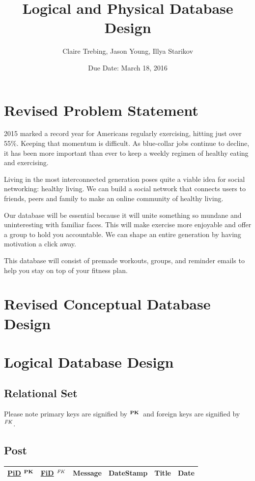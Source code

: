 \documentclass{article}
\title{Logical and Physical Database Design}
\author{Claire Trebing, Jason Young, Illya Starikov}
\date{Due Date: March 18, 2016}
\newcommand{\pk}{$^{\text{\textbf{PK}}}$}
\newcommand{\fk}{$^{\text{\textit{FK}}}$}
\begin{document}
\maketitle

\section{Revised Problem Statement}
2015 marked a record year for Americans regularly exercising, hitting just over 55\%. Keeping that momentum is difficult. As blue-collar jobs continue to decline, it has been more important than ever to keep a weekly regimen of healthy eating and exercising.

Living in the most interconnected generation poses quite a viable idea for social networking: healthy living. We can build a social network that connects users to friends, peers and family to make an online community of healthy living.

Our database will be essential because it will unite something so mundane and uninteresting with familiar faces. This will make exercise more enjoyable and offer a group to hold you accountable. We can shape an entire generation by having motivation a click away.

This database will consist of premade workouts, groups, and reminder emails to help you stay on top of your fitness plan.

\section{Revised Conceptual Database Design}


\section{Logical Database Design}
\subsection{Relational Set}
Please note primary keys are signified by \pk \ and foreign keys are signified by \fk.

\subsection*{Post}
\begin{tabular}{|l|l|l|l|l|l|}
\hline
\underline{PiD} \pk & \underline{FiD} \fk & Message & DateStamp & Title & Date \\
\hline
\end{tabular}
\end{document}
